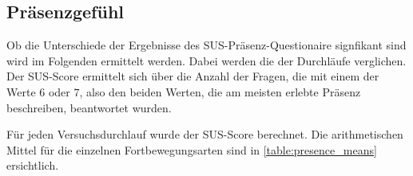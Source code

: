 
                \subsection{Präsenzgefühl}
                    Ob die Unterschiede der Ergebnisse des SUS-Präsenz-Questionaire signfikant sind wird im Folgenden ermittelt werden. Dabei werden die  der Durchläufe verglichen. Der SUS-Score ermittelt sich über die Anzahl der Fragen, die mit einem der Werte $6$ oder $7$, also den beiden Werten, die am meisten erlebte Präsenz beschreiben, beantwortet wurden.

                    Für jeden Versuchsdurchlauf wurde der SUS-Score berechnet. Die arithmetischen Mittel für die einzelnen Fortbewegungsarten sind in \autoref{table:presence_means} ersichtlich.

